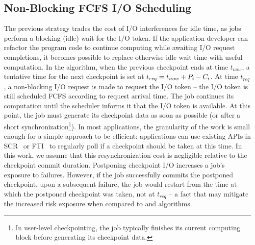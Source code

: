 
\subsection{Non-Blocking \fifononblock FCFS I/O Scheduling}
\label{sec:fcfsnonblock}

The previous strategy trades the cost of I/O interferences for
idle time, as jobs perform a blocking (idle) wait for the I/O token.
If the application developer can refactor the program code to continue
computing while awaiting I/O request completions, it becomes possible
to replace otherwise idle wait time with useful computation. In the
\fifononblock algorithm, when the previous checkpoint ends at time
$t_{now}$, a tentative time for the next checkpoint is set at
$t_{req}=t_{now}+P_{i}-C_{i}$.  At time $t_{req}$, a
non-blocking I/O request is made to request the I/O token -- the I/O
token is still scheduled FCFS according to request arrival time.  The
job continues its computation until the scheduler informs it that the
I/O token is available. At this point, the job must generate its
checkpoint data as soon as possible (or after a short
synchronization\footnote{In user-level checkpointing, the job typically
  finishes its current computing block before generating its
  checkpoint data.}).  In most applications, the granularity of the
work is small enough for a simple approach to be efficient:
applications can use existing APIs in SCR~\cite{Moody10_SCR} or
FTI~\cite{Bautista-Gomez11_FTI} to regularly poll if a checkpoint
should be taken at this time. In this work, we assume that this
resynchronization cost is negligible relative to the checkpoint commit
duration.
%
%
Postponing checkpoint I/O increases a job's exposure to failures.  However,
if the job successfully commits the postponed checkpoint, upon a subsequent failure,
the job would restart from the time at which the postponed checkpoint was taken, not
at $t_{req}$ -- a fact that may mitigate the increased risk exposure when
compared to \fifoblock and \nocoop algorithms.

